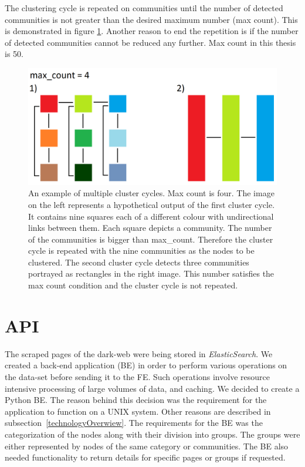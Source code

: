 The clustering cycle is repeated on communities until the number of detected communities is not greater than the desired maximum number (max count). This is demonstrated in figure \ref{clusteringCyclesExample}. Another reason to end the repetition is if the number of detected communities cannot be reduced any further. Max count in this thesis is 50.
\begin{figure}[ht!]
  \centering
  \includegraphics[width=\textwidth]{Images/clusteringCyclesExample.png}
  \caption{An example of multiple cluster cycles. Max count is four. The image on the left represents a hypothetical output of the first cluster cycle. It contains nine squares each of a different colour with undirectional links between them. Each square depicts a community. The number of the communities is bigger than max\_count. Therefore the cluster cycle is repeated with the nine communities as the nodes to be clustered. The second cluster cycle detects three communities portrayed as rectangles in the right image. This number satisfies the max count condition and the cluster cycle is not repeated.}
  \label{clusteringCyclesExample}
\end{figure} 

\section{API}\label{APIDevelopment}
The scraped pages of the dark-web were being stored in \textit{ElasticSearch}. We created a back-end application (BE) in order to perform various operations on the data-set before sending it to the FE. Such operations involve resource intensive processing of large volumes of data, and caching. We decided to create a Python BE. The reason behind this decision was the requirement for the application to function on a UNIX system. Other reasons are described in subsection~\ref{technologyOverwiew}. The requirements for the BE was the categorization of the nodes along with their division into groups. The groups were either represented by nodes of the same category or communities. The BE also needed functionality to return details for specific pages or groups if requested.
